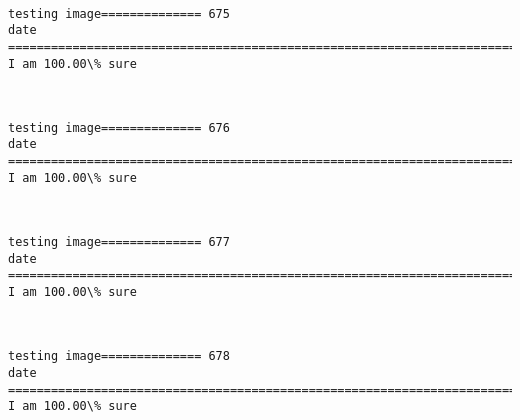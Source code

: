 \documentclass[11pt]{article}
\begin{document}
    \begin{center}
    \end{center}
    { \hspace*{\fill} \\}
    
    \begin{Verbatim}[commandchars=\\\{\}]
testing image============== 675
date
============================================================================
I am 100.00\% sure

    \end{Verbatim}

    \begin{center}
    \end{center}
    { \hspace*{\fill} \\}
    
    \begin{Verbatim}[commandchars=\\\{\}]
testing image============== 676
date
============================================================================
I am 100.00\% sure

    \end{Verbatim}

    \begin{center}
    \end{center}
    { \hspace*{\fill} \\}
    
    \begin{Verbatim}[commandchars=\\\{\}]
testing image============== 677
date
============================================================================
I am 100.00\% sure

    \end{Verbatim}

    \begin{center}
    \end{center}
    { \hspace*{\fill} \\}
    
    \begin{Verbatim}[commandchars=\\\{\}]
testing image============== 678
date
============================================================================
I am 100.00\% sure

    \end{Verbatim}
\end{document}

